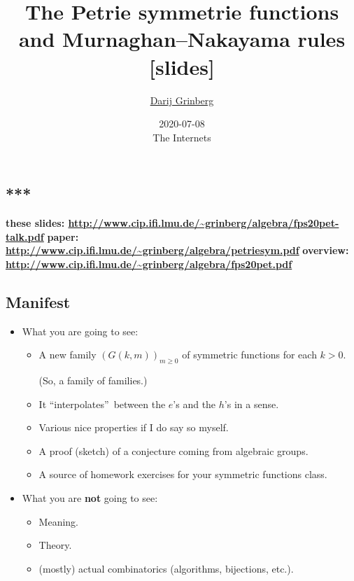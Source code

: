 \documentclass[numbers=enddot,12pt,final,onecolumn,notitlepage]{scrartcl}%
\newcommand{\0}{\phantom{c}}
\begin{document}
\title{The Petrie symmetrie functions and Murnaghan--Nakayama rules [slides]}
\author{\href{http://www.cip.ifi.lmu.de/~grinberg/}{Darij Grinberg}}
\date{2020-07-08\\
The Internets}
\maketitle
\tableofcontents

\subsection*{***}

\textbf{these slides: \color{red}
\url{http://www.cip.ifi.lmu.de/~grinberg/algebra/fps20pet-talk.pdf}}%
\newline\textbf{paper: \color{red}
\url{http://www.cip.ifi.lmu.de/~grinberg/algebra/petriesym.pdf}}%
\newline\textbf{overview: \color{red}
\url{http://www.cip.ifi.lmu.de/~grinberg/algebra/fps20pet.pdf}} \newline

\subsection{Manifest}

\begin{itemize}
\item What you are going to see:

\begin{itemize}
\item A new family $\left(  G\left(  k,m\right)  \right)  _{m\geq0}$ of
symmetric functions for each $k>0$.

(So, a family of families.)

\item It \textquotedblleft interpolates\textquotedblright\ between the $e$'s
and the $h$'s in a sense.

\item Various nice properties if I do say so myself.

\item A proof (sketch) of a conjecture coming from algebraic groups.

\item A source of homework exercises for your symmetric functions class.
\end{itemize}

\item What you are \textbf{not} going to see:

\begin{itemize}
\item Meaning.

\item Theory.

\item (mostly) actual combinatorics (algorithms, bijections, etc.).
\end{itemize}
\end{itemize}
\end{document}
